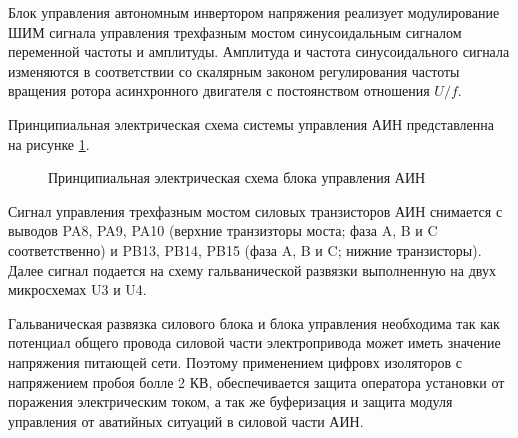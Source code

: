 
        Блок управления автономным инвертором напряжения реализует
        модулирование ШИМ сигнала управления трехфазным мостом синусоидальным
        сигналом переменной частоты и амплитуды. Амплитуда и частота
        синусоидального сигнала изменяются в соответствии со скалярным законом
        регулирования частоты вращения ротора асинхронного двигателя с
        постоянством отношения $U/f$.

        Принципиальная электрическая схема системы управления АИН представленна
        на рисунке \ref{fig:control-schematic}.

        \begin{figure}
            \caption{Принципиальная электрическая схема блока управления АИН}
            \label{fig:control-schematic}
        \end{figure}

        Сигнал управления трехфазным мостом силовых транзисторов АИН снимается
        с выводов PA8, PA9, PA10 (верхние транзизторы моста; фаза A, B и C
        соответственно) и PB13, PB14, PB15 (фаза A, B и C; нижние транзисторы).
        Далее сигнал подается на схему гальванической развязки выполненную на
        двух микросхемах U3 и U4. 
        
        Гальваническая развязка силового блока и блока управления необходима
        так как потенциал общего провода силовой части электропривода может
        иметь значение напряжения питающей сети. Поэтому применением цифровх
        изоляторов с напряжением пробоя болле 2 КВ, обеспечивается защита
        оператора установки от поражения электрическим током, а так же
        буферизация и защита модуля управления от аватийных ситуаций в силовой
        части АИН.

